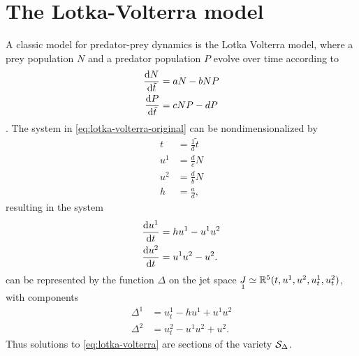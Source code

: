 \chapter{The Lotka-Volterra model}

A classic model for predator-prey dynamics is the Lotka Volterra model, where a prey population \(N\) and a predator population \(P\) evolve over time according to
\begin{subequations}
  \label{eq:lotka-volterra-original}  
  \begin{align}
    \dv{N}{\tilde{t}} &= a N - b N P\\
    \dv{P}{\tilde{t}} &= c N P - d P
  \end{align}
\end{subequations}
\cite{murray2002biology}.
The system in \cref{eq:lotka-volterra-original} can be nondimensionalized by
\begin{align}
  t &= \frac{1}{d} \tilde{t}\\
  u^1 &= \frac{d}{c} N\\
  u^2 &= \frac{d}{b} N\\
  h &= \frac{a}{d},
\end{align}
resulting in the system
\begin{subequations}
  \label{eq:lotka-volterra}  
  \begin{align}
    \dv{u^1}{t} &= h u^1 - u^1 u^2\\
    \dv{u^2}{t} &= u^1 u^2 - u^2.
  \end{align}
\end{subequations}
 can be represented by the function \(\Delta\) on the jet space \(\prolong{J}{1} \simeq \reals^5(t, u^1, u^2, u^1_t, u^2_t)\), with components
\begin{align}
  \Delta^1 &= u^1_t - h u^1 + u^1 u^2 \label{eq:lotka-volterra-delta1}\\
  \Delta^2 &= u^2_t - u^1 u^2 + u^2. \label{eq:lotka-volterra-delta2}
\end{align}
Thus solutions to \cref{eq:lotka-volterra} are sections of the variety \(\variety_\Delta\).

